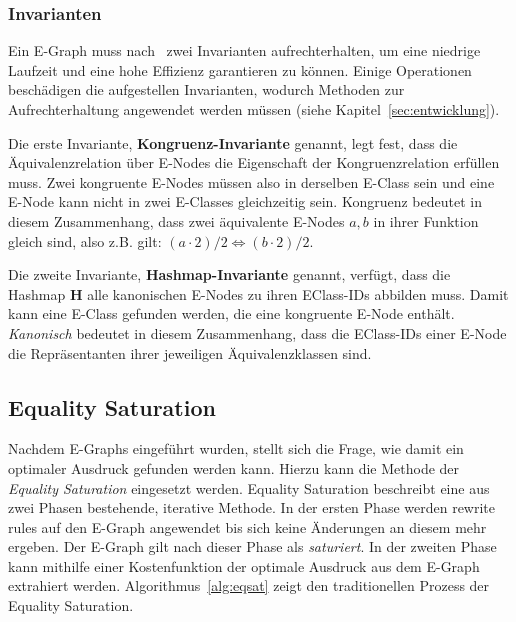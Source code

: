 \subsubsection{Invarianten}

Ein E-Graph muss nach~\cite{2021-egg} zwei Invarianten aufrechterhalten, um eine niedrige Laufzeit und eine hohe Effizienz garantieren zu können. 
Einige Operationen beschädigen die aufgestellen Invarianten, wodurch Methoden zur Aufrechterhaltung angewendet werden müssen (siehe Kapitel~\ref{sec:entwicklung}).

Die erste Invariante, \textbf{Kongruenz-Invariante} genannt, legt fest, dass die Äquivalenzrelation über E-Nodes die Eigenschaft der Kongruenzrelation erfüllen muss.
Zwei kongruente E-Nodes müssen also in derselben E-Class sein und eine E-Node kann nicht in zwei E-Classes gleichzeitig sein.
Kongruenz bedeutet in diesem Zusammenhang, dass zwei äquivalente E-Nodes $a, b$ in ihrer Funktion gleich sind, also z.B. gilt: $(a \cdot 2) / 2 \Leftrightarrow (b \cdot 2) / 2$.

Die zweite Invariante, \textbf{Hashmap-Invariante} genannt, verfügt, dass die Hashmap $\mathbf{H}$ alle kanonischen E-Nodes zu ihren EClass-IDs abbilden muss.
Damit kann eine E-Class gefunden werden, die eine kongruente E-Node enthält. \textit{Kanonisch} bedeutet in diesem Zusammenhang, dass die EClass-IDs einer E-Node die Repräsentanten ihrer jeweiligen Äquivalenzklassen sind.

\subsection{Equality Saturation}

Nachdem E-Graphs eingeführt wurden, stellt sich die Frage, wie damit ein optimaler Ausdruck gefunden werden kann.
Hierzu kann die Methode der \textit{Equality Saturation} eingesetzt werden.
Equality Saturation beschreibt eine aus zwei Phasen bestehende, iterative Methode.
In der ersten Phase werden rewrite rules auf den E-Graph angewendet bis sich keine Änderungen an diesem mehr ergeben.
Der E-Graph gilt nach dieser Phase als \textit{saturiert}.
In der zweiten Phase kann mithilfe einer Kostenfunktion der optimale Ausdruck aus dem E-Graph extrahiert werden.
Algorithmus~\ref{alg:eqsat} zeigt den traditionellen Prozess der Equality Saturation.

